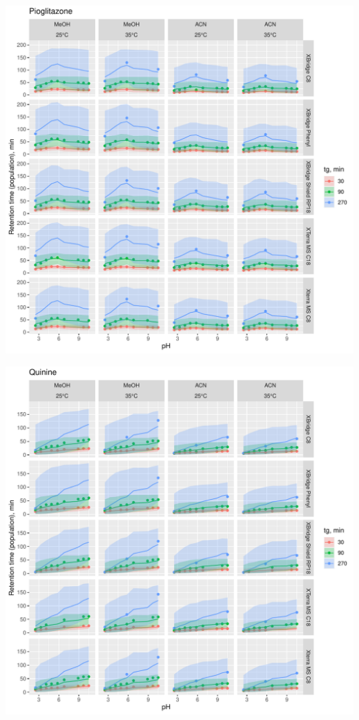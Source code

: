 \documentclass[
]{article}
\begin{document}
\newpage{}

\includegraphics{../figures/concordanceplots/Pioglitazone.population.pdf}

\newpage{}

\includegraphics{../figures/concordanceplots/Quinine.population.pdf}
\end{document}
